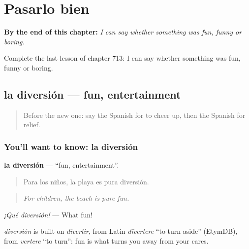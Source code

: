 
\chapter{Pasarlo bien}
\label{ch:es-pasarlo-bien}

\begin{chapteropening}
\textbf{By the end of this chapter:} \emph{I can say whether something was fun, funny or boring.}

Complete the last lesson of chapter 713: I can say whether something was fun, funny or boring.
\end{chapteropening}

\section[la diversión]{la diversión — fun, entertainment}

\label{lesson:ES-C713-diversion}



\begin{quote}
Before the new one: say the Spanish for to cheer up, then the Spanish for relief.
\end{quote}

\subsection*{You'll want to know: la diversión}
\textbf{la diversión} — \textquotedblleft{}fun, entertainment\textquotedblright{}.

\begin{quote}
Para los niños, la playa es pura diversión.
\end{quote}

\begin{quote}
\emph{For children, the beach is pure fun.}
\end{quote}

\emph{¡Qué diversión!} — What fun!

\begin{cousinweb}
\emph{diversión} is built on \emph{divertir}, from Latin \emph{dīvertere} \textquotedblleft{}to turn aside\textquotedblright{} (EtymDB), from \emph{vertere} \textquotedblleft{}to turn\textquotedblright{}: fun is what turns you away from your cares.
\end{cousinweb}

